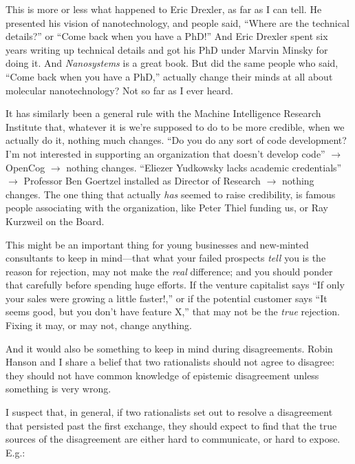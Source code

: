 {
 This is more or less what happened to Eric Drexler, as far as I
can tell. He presented his vision of nanotechnology, and people said,
``Where are the technical details?''
or ``Come back when you have a
PhD!'' And Eric Drexler spent six years writing up
technical details and got his PhD under Marvin Minsky for doing it. And
\textit{Nanosystems} is a great book. But did the same people who said,
``Come back when you have a PhD,''
actually change their minds at all about molecular nanotechnology? Not
so far as I ever heard.}

{
 It has similarly been a general rule with the Machine Intelligence
Research Institute that, whatever it is we're supposed
to do to be more credible, when we actually do it, nothing much
changes. ``Do you do any sort of code development?
I'm not interested in supporting an organization that
doesn't develop code'' $\rightarrow $
OpenCog $\rightarrow $ nothing changes. ``Eliezer
Yudkowsky lacks academic credentials'' $\rightarrow $
Professor Ben Goertzel installed as Director of Research $\rightarrow $
nothing changes. The one thing that actually \textit{has} seemed to
raise credibility, is famous people associating with the organization,
like Peter Thiel funding us, or Ray Kurzweil on the Board.}

{
 This might be an important thing for young businesses and
new-minted consultants to keep in mind---that what your failed
prospects \textit{tell} you is the reason for rejection, may not make
the \textit{real} difference; and you should ponder that carefully
before spending huge efforts. If the venture capitalist says
``If only your sales were growing a little
faster!,'' or if the potential customer says
``It seems good, but you don't have
feature X,'' that may not be the \textit{true}
rejection. Fixing it may, or may not, change anything.}

{
 And it would also be something to keep in mind during
disagreements. Robin Hanson and I share a belief that two rationalists
should not agree to disagree: they should not have common knowledge of
epistemic disagreement unless something is very wrong.}

{
 I suspect that, in general, if two rationalists set out to resolve
a disagreement that persisted past the first exchange, they should
expect to find that the true sources of the disagreement are either
hard to communicate, or hard to expose. E.g.:}

